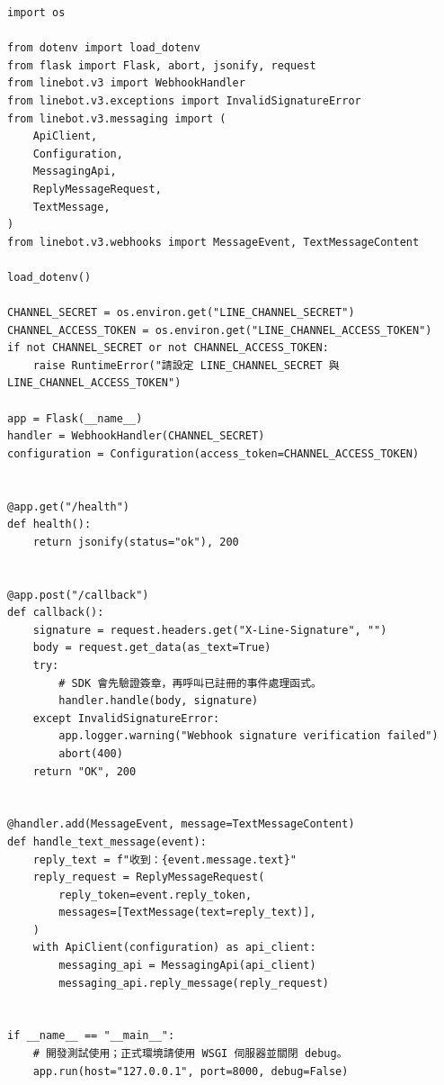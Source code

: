 \documentclass[12pt,a4paper]{report}
\begin{document}
\begin{lstlisting}[style=pythonstyle,caption={Python Flask LINE Echo Bot（app.py）},label={lst:app}]
import os

from dotenv import load_dotenv
from flask import Flask, abort, jsonify, request
from linebot.v3 import WebhookHandler
from linebot.v3.exceptions import InvalidSignatureError
from linebot.v3.messaging import (
    ApiClient,
    Configuration,
    MessagingApi,
    ReplyMessageRequest,
    TextMessage,
)
from linebot.v3.webhooks import MessageEvent, TextMessageContent

load_dotenv()

CHANNEL_SECRET = os.environ.get("LINE_CHANNEL_SECRET")
CHANNEL_ACCESS_TOKEN = os.environ.get("LINE_CHANNEL_ACCESS_TOKEN")
if not CHANNEL_SECRET or not CHANNEL_ACCESS_TOKEN:
    raise RuntimeError("請設定 LINE_CHANNEL_SECRET 與 LINE_CHANNEL_ACCESS_TOKEN")

app = Flask(__name__)
handler = WebhookHandler(CHANNEL_SECRET)
configuration = Configuration(access_token=CHANNEL_ACCESS_TOKEN)


@app.get("/health")
def health():
    return jsonify(status="ok"), 200


@app.post("/callback")
def callback():
    signature = request.headers.get("X-Line-Signature", "")
    body = request.get_data(as_text=True)
    try:
        # SDK 會先驗證簽章，再呼叫已註冊的事件處理函式。
        handler.handle(body, signature)
    except InvalidSignatureError:
        app.logger.warning("Webhook signature verification failed")
        abort(400)
    return "OK", 200


@handler.add(MessageEvent, message=TextMessageContent)
def handle_text_message(event):
    reply_text = f"收到：{event.message.text}"
    reply_request = ReplyMessageRequest(
        reply_token=event.reply_token,
        messages=[TextMessage(text=reply_text)],
    )
    with ApiClient(configuration) as api_client:
        messaging_api = MessagingApi(api_client)
        messaging_api.reply_message(reply_request)


if __name__ == "__main__":
    # 開發測試使用；正式環境請使用 WSGI 伺服器並關閉 debug。
    app.run(host="127.0.0.1", port=8000, debug=False)
\end{lstlisting}
\end{document}
